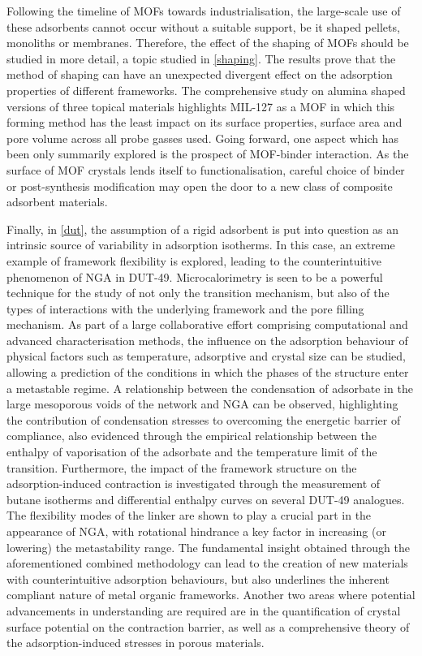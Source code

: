 Following the timeline of MOFs towards industrialisation, the 
large-scale use of these adsorbents cannot occur without a suitable
support, be it shaped pellets, monoliths or membranes. Therefore,
the effect of the shaping of MOFs should be studied in more detail,
a topic studied in \autoref{shaping}. The results prove that the method
of shaping can have an unexpected divergent effect on the adsorption 
properties of different frameworks. The comprehensive study on 
alumina shaped versions of three topical materials highlights
MIL-127 as a MOF in which this forming method has the least impact on
its surface properties, surface area and pore volume across all 
probe gasses used. Going forward, one aspect which has been only 
summarily explored is the prospect of MOF-binder interaction. 
As the surface of MOF crystals lends itself to functionalisation, 
careful choice of binder or post-synthesis modification may open the
door to a new class of composite adsorbent materials.

Finally, in \autoref{dut}, the assumption of a rigid adsorbent 
is put into question as an intrinsic source of variability in adsorption
isotherms. In this case, an extreme example of framework flexibility
is explored, leading to the counterintuitive phenomenon of NGA
in DUT-49.
Microcalorimetry is seen to be a powerful technique for the study
of not only the transition mechanism, but also of the types of
interactions with the underlying framework and the pore filling
mechanism. As part of a large collaborative effort comprising
computational and advanced characterisation methods, the
influence on the adsorption behaviour of physical factors such
as temperature, adsorptive and crystal size can be studied, allowing
a prediction of the conditions in which the phases of the structure
enter a metastable regime. A relationship between the condensation 
of adsorbate in the large mesoporous voids of the network and NGA
can be observed, highlighting the contribution of condensation 
stresses to overcoming the energetic barrier of compliance, also 
evidenced through the empirical relationship between the enthalpy
of vaporisation of the adsorbate and the temperature limit 
of the transition. Furthermore, the impact of the framework
structure on the adsorption-induced contraction is investigated
through the measurement of butane isotherms and differential enthalpy
curves on several DUT-49 analogues. The flexibility modes of the 
linker are shown to play a crucial part in the appearance of 
NGA, with rotational hindrance a key factor in increasing
(or lowering) the metastability range. The fundamental insight obtained 
through the aforementioned combined methodology
can lead to the creation of new materials with counterintuitive
adsorption behaviours, but also underlines the inherent compliant
nature of metal organic frameworks. Another two areas where potential
advancements in understanding are required are in the quantification 
of crystal surface potential on the contraction barrier, as well as 
a comprehensive theory of the adsorption-induced stresses in porous
materials. 

